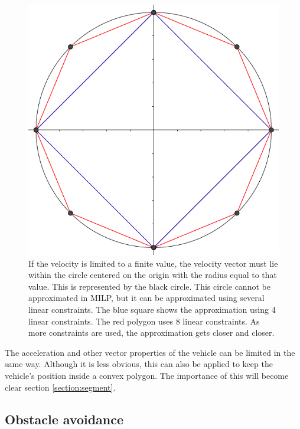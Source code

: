 \begin{figure}
    \centering
        \includegraphics[width=0.7\columnwidth]{img/circlelinear}
    \caption{If the velocity is limited to a finite value, the velocity vector must lie within the circle centered on the origin with the radius equal to that value. This is represented by the black circle. This circle cannot be approximated in MILP, but it can be approximated using several linear constraints. The blue square shows the approximation using 4 linear constraints. The red polygon uses 8 linear constraints. As more constraints are used, the approximation gets closer and closer. }\label{fig:circlelinear}
\end{figure}
The acceleration and other vector properties of the vehicle can be limited in the same way. Although it is less obvious, this can also be applied to keep the vehicle's position inside a convex polygon. The importance of this will become clear section \ref{section:segment}.

\subsection{Obstacle avoidance}

